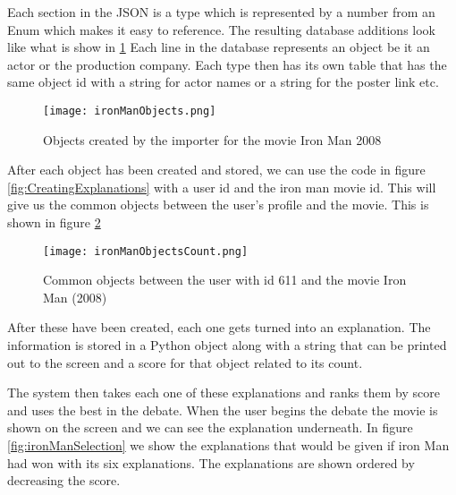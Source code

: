                 Each section in the JSON is a type which is represented by a number from an Enum which makes it easy to reference. The resulting database additions look like what is show in \ref{fig:ironManObjects} Each line in the database represents an object be it an actor or the production company. Each type then has its own table that has the same object id with a string for actor names or a string for the poster link etc.




        

                \begin{figure}[!htb]
                    \texttt{[image: ironManObjects.png]} 
                    \caption{Objects created by the importer for the movie Iron Man 2008}
                    \label{fig:ironManObjects}
                \end{figure}



                After each object has been created and stored, we can use the code in figure \ref{fig:CreatingExplanations} with a user id and the iron man movie id. This will give us the common objects between the user's profile and the movie. This is shown in figure \ref{fig:ironManObjectsCount}


                \begin{figure}[!htb]
                    \texttt{[image: ironManObjectsCount.png]} 
                    \caption{Common objects between the user with id 611 and the movie Iron Man (2008)}
                    \label{fig:ironManObjectsCount}
                \end{figure}


                After these have been created, each one gets turned into an explanation. The information is stored in a Python object along with a string that can be printed out to the screen and a score for that object related to its count. 

                The system then takes each one of these explanations and ranks them by score and uses the best in the debate. When the user begins the debate the movie is shown on the screen and we can see the explanation underneath. In figure \ref{fig:ironManSelection} we show the explanations that would be given if iron Man had won with its six explanations. The explanations are shown ordered by decreasing the score. 

